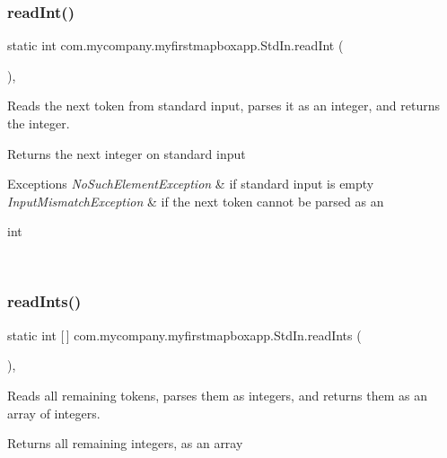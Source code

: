 \subsubsection{\texorpdfstring{read\+Int()}{readInt()}}
{\footnotesize\ttfamily static int com.\+mycompany.\+myfirstmapboxapp.\+Std\+In.\+read\+Int (\begin{DoxyParamCaption}{ }\end{DoxyParamCaption})\hspace{0.3cm}{\ttfamily [inline]}, {\ttfamily [static]}}

Reads the next token from standard input, parses it as an integer, and returns the integer.

\begin{DoxyReturn}{Returns}
the next integer on standard input 
\end{DoxyReturn}

\begin{DoxyExceptions}{Exceptions}
{\em No\+Such\+Element\+Exception} & if standard input is empty \\
\hline
{\em Input\+Mismatch\+Exception} & if the next token cannot be parsed as an
\begin{DoxyCode}
\textcolor{keywordtype}{int} 
\end{DoxyCode}
 \\
\hline
\end{DoxyExceptions}
\mbox{\label{classcom_1_1mycompany_1_1myfirstmapboxapp_1_1_std_in_ac4cf9ccdcd6db72e410848ced70c6397}} 
\subsubsection{\texorpdfstring{read\+Ints()}{readInts()}}
{\footnotesize\ttfamily static int \mbox{[}$\,$\mbox{]} com.\+mycompany.\+myfirstmapboxapp.\+Std\+In.\+read\+Ints (\begin{DoxyParamCaption}{ }\end{DoxyParamCaption})\hspace{0.3cm}{\ttfamily [inline]}, {\ttfamily [static]}}

Reads all remaining tokens, parses them as integers, and returns them as an array of integers. \begin{DoxyReturn}{Returns}
all remaining integers, as an array 
\end{DoxyReturn}

